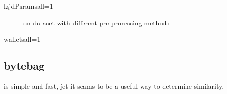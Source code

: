 \documentclass[../main.tex]{subfiles}
\begin{document}
\begin{sepTbl}{lzjdParams}{all}{=1}
  \caption{  and  on all codes from \n{\solcts}}
  \label{tbl:lz_solc_sep}
\end{sepTbl}

\begin{figure}[ht!]
  \centering
  \caption{ on  dataset with different pre-processing methods}
  \label{fig:hist_wallets_lzjd}
\end{figure}

\begin{sepTbl}{wallets}{all}{=1}
  \caption{  and  on all  codes}
  \label{tbl:lz_wall_sep}
\end{sepTbl}

\subsection{bytebag}
\begin{obs}
   is simple and fast, jet it seams to be a useful way to determine similarity.
\end{obs}
\end{document}
